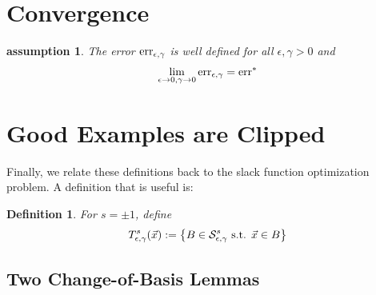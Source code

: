 \documentclass{article}
\newtheorem{assumption}[theorem]{assumption}
\newtheorem{defn}[thm]{Definition}
\newcommand{\err}{\mbox{err}}
\newcommand{\x}{\vec{x}}
\newcommand{\lrsetb}[1]{\left\{#1\right\}}
\begin{document}
\section{Convergence}


\begin{assumption} The error $\erreg$ is well defined for all
  $\epsilon,\gamma>0$ and
  \[
  \lim_{\epsilon \to 0, \gamma \to 0} \erreg = \err^*
  \]
\end{assumption}






\section{Good Examples are Clipped}

Finally, we relate these definitions back to the slack function optimization problem. 
A definition that is useful is:
\begin{defn}
For $s = \pm 1$, define 
\begin{align*}
T_{\epsilon, \gamma}^{s} (\x) := \lrsetb{ B \in \SepsGam^{s} \mbox{ s.t. } \x \in B}
\end{align*}
\end{defn}

\subsection{Two Change-of-Basis Lemmas}
\end{document}
